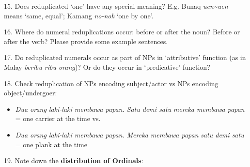 15. Does reduplicated {\textquoteleft}one{\textquoteright} have any special meaning? E.g. Bunaq \textit{uen\~{}uen} means {\textquoteleft}same, equal{\textquoteright}; Kamang \textit{no-nok }{\textquoteleft}one by one{\textquoteright}.

16. Where do numeral reduplications occur: before or after the noun? Before or after the verb? Please provide some example sentences.

17. Do reduplicated numerals occur as part of NPs in {\textquoteleft}attributive{\textquoteright} function (as in Malay \textit{beribu-ribu orang})? Or do they occur in {\textquoteleft}predicative{\textquoteright} function? 

18. Check reduplication of NPs encoding subject/actor vs NPs encoding object/undergoer: 

\begin{itemize}
\item \textit{Dua orang laki-laki membawa papan. }\textit{Satu demi satu}\textit{ mereka membawa papan }= one carrier at the time vs. 
\item \textit{Dua orang laki-laki membawa papan. }\textit{Mereka membawa papan }\textit{satu demi satu}\textit{ }= one plank at the time
\end{itemize}
19. Note down the \textbf{distribution of Ordinals}: 

